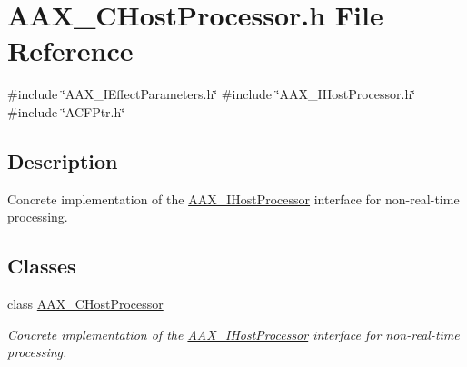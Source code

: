 \hypertarget{a00431}{}\section{A\+A\+X\+\_\+\+C\+Host\+Processor.\+h File Reference}
\label{a00431}
{\ttfamily \#include \char`\"{}A\+A\+X\+\_\+\+I\+Effect\+Parameters.\+h\char`\"{}}\newline
{\ttfamily \#include \char`\"{}A\+A\+X\+\_\+\+I\+Host\+Processor.\+h\char`\"{}}\newline
{\ttfamily \#include \char`\"{}A\+C\+F\+Ptr.\+h\char`\"{}}\newline


\subsection{Description}
Concrete implementation of the \mbox{\hyperlink{a01833}{A\+A\+X\+\_\+\+I\+Host\+Processor}} interface for non-\/real-\/time processing. 

\subsection*{Classes}
\begin{DoxyCompactItemize}
\item 
class \mbox{\hyperlink{a01485}{A\+A\+X\+\_\+\+C\+Host\+Processor}}
\begin{DoxyCompactList}\small\item\em Concrete implementation of the \mbox{\hyperlink{a01833}{A\+A\+X\+\_\+\+I\+Host\+Processor}} interface for non-\/real-\/time processing. \end{DoxyCompactList}\end{DoxyCompactItemize}
